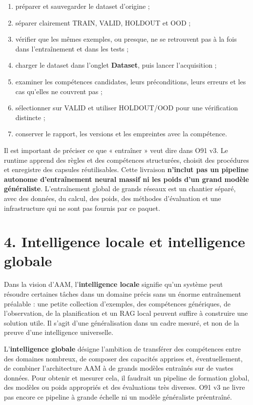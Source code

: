 \documentclass[11pt,a4paper]{article}
\begin{document}
\begin{enumerate}
\item préparer et sauvegarder le dataset d'origine ;
\item séparer clairement TRAIN, VALID, HOLDOUT et OOD ;
\item vérifier que les mêmes exemples, ou presque, ne se retrouvent pas à la fois dans l'entraînement et dans les tests ;
\item charger le dataset dans l'onglet \textbf{Dataset}, puis lancer l'acquisition ;
\item examiner les compétences candidates, leurs préconditions, leurs erreurs et les cas qu'elles ne couvrent pas ;
\item sélectionner sur VALID et utiliser HOLDOUT/OOD pour une vérification distincte ;
\item conserver le rapport, les versions et les empreintes avec la compétence.
\end{enumerate}

Il est important de préciser ce que « entraîner » veut dire dans O91 v3. Le runtime apprend des règles et des compétences structurées, choisit des procédures et enregistre des capsules réutilisables. Cette livraison \textbf{n'inclut pas un pipeline autonome d'entraînement neural massif ni les poids d'un grand modèle généraliste}. L'entraînement global de grands réseaux est un chantier séparé, avec des données, du calcul, des poids, des méthodes d'évaluation et une infrastructure qui ne sont pas fournis par ce paquet.

\section*{4. Intelligence locale et intelligence globale}

Dans la vision d'AAM, l'\textbf{intelligence locale} signifie qu'un système peut résoudre certaines tâches dans un domaine précis sans un énorme entraînement préalable : une petite collection d'exemples, des compétences génériques, de l'observation, de la planification et un RAG local peuvent suffire à construire une solution utile. Il s'agit d'une généralisation dans un cadre mesuré, et non de la preuve d'une intelligence universelle.

L'\textbf{intelligence globale} désigne l'ambition de transférer des compétences entre des domaines nombreux, de composer des capacités apprises et, éventuellement, de combiner l'architecture AAM à de grands modèles entraînés sur de vastes données. Pour obtenir et mesurer cela, il faudrait un pipeline de formation global, des modèles ou poids appropriés et des évaluations très diverses. O91 v3 ne livre pas encore ce pipeline à grande échelle ni un modèle généraliste préentraîné.
\end{document}
